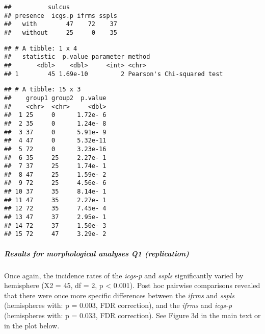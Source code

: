 \documentclass[
]{article}
\newenvironment{Shaded}{\begin{snugshade}}{\end{snugshade}}
\newcommand{\CommentTok}[1]{\textcolor[rgb]{0.56,0.35,0.01}{\textit{#1}}}
\newcommand{\KeywordTok}[1]{\textcolor[rgb]{0.13,0.29,0.53}{\textbf{#1}}}
\newcommand{\NormalTok}[1]{#1}
\newcommand{\OperatorTok}[1]{\textcolor[rgb]{0.81,0.36,0.00}{\textbf{#1}}}
\newcommand{\StringTok}[1]{\textcolor[rgb]{0.31,0.60,0.02}{#1}}
\begin{document}
\begin{verbatim}
##          sulcus
## presence  icgs.p ifrms sspls
##   with        47    72    37
##   without     25     0    35
\end{verbatim}

\begin{Shaded}
\end{Shaded}

\begin{verbatim}
## # A tibble: 1 x 4
##   statistic  p.value parameter method                    
##       <dbl>    <dbl>     <int> <chr>                     
## 1        45 1.69e-10         2 Pearson's Chi-squared test
\end{verbatim}

\begin{Shaded}
\end{Shaded}

\begin{verbatim}
## # A tibble: 15 x 3
##    group1 group2  p.value
##    <chr>  <chr>     <dbl>
##  1 25     0      1.72e- 6
##  2 35     0      1.24e- 8
##  3 37     0      5.91e- 9
##  4 47     0      5.32e-11
##  5 72     0      3.23e-16
##  6 35     25     2.27e- 1
##  7 37     25     1.74e- 1
##  8 47     25     1.59e- 2
##  9 72     25     4.56e- 6
## 10 37     35     8.14e- 1
## 11 47     35     2.27e- 1
## 12 72     35     7.45e- 4
## 13 47     37     2.95e- 1
## 14 72     37     1.50e- 3
## 15 72     47     3.29e- 2
\end{verbatim}

\hypertarget{results-for-morphological-analyses-q1-replication}{%
\subparagraph{Results for morphological analyses Q1
(replication)}\label{results-for-morphological-analyses-q1-replication}}

Once again, the incidence rates of the \emph{icgs-p} and \emph{sspls}
significantly varied by hemisphere (X2 = 45, df = 2, p \textless{}
0.001). Post hoc pairwise comparisons revealed that there were once more
specific differences between the \emph{ifrms} and \emph{sspls}
(hemispheres with: p = 0.003, FDR correction), and the \emph{ifrms} and
\emph{icgs-p} (hemispheres with: p = 0.033, FDR correction). See Figure
3d in the main text or in the plot below.
\end{document}
